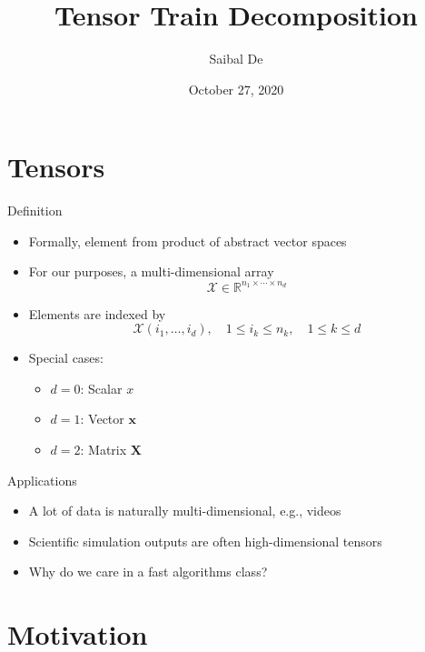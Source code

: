 \documentclass[aspectratio=169]{beamer}
\title{Tensor Train Decomposition}
\author{Saibal De}
\date{October 27, 2020}
\renewcommand{\Vec}[1]{\bm{#1}}
\newcommand{\Mat}[1]{\mathbf{#1}}
\newcommand{\Tns}[1]{\mathcal{#1}}
\newcommand{\RR}{\mathbb{R}}
\begin{document}
\begin{frame}
    \titlepage
\end{frame}

\section{Tensors}

\begin{frame}{Definition}
  \begin{itemize}
    \item
      Formally, element from product of abstract vector spaces
    \item
      For our purposes, a multi-dimensional array
      \begin{equation*}
        \Tns{X} \in \RR^{n_1 \times \cdots \times n_d}
      \end{equation*}
    \item
      Elements are indexed by
      \begin{equation*}
        \Tns{X}(i_1, \ldots, i_d), \quad 1 \leq i_k \leq n_k, \quad 1 \leq k
        \leq d
      \end{equation*}
    \item
      Special cases:
      \begin{itemize}
        \item
          $d = 0$: Scalar $x$
        \item
          $d = 1$: Vector $\Vec{x}$
        \item
          $d = 2$: Matrix $\Mat{X}$
      \end{itemize}
  \end{itemize}
\end{frame}

\begin{frame}{Applications}
  \begin{itemize}
    \item
      A lot of data is naturally multi-dimensional, e.g., videos
    \item
      Scientific simulation outputs are often high-dimensional tensors
    \item
      Why do we care in a fast algorithms class?
  \end{itemize}
\end{frame}

\section{Motivation}
\end{document}
